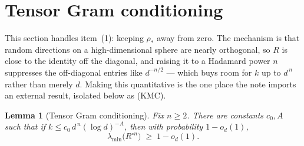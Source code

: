 \documentclass[11pt]{article}
\newtheorem{lemma}{Lemma}
\theoremstyle{remark}
\newcommand{\lmin}{\lambda_{\min}}
\begin{document}
\section{Tensor Gram conditioning}\label{sec:tensor}

This section handles item~(1): keeping $\rho_*$ away from zero. The mechanism is that random directions on a high-dimensional sphere are nearly orthogonal, so $R$ is close to the identity off the diagonal, and raising it to a Hadamard power $n$ suppresses the off-diagonal entries like $d^{-n/2}$ --- which buys room for $k$ up to $d^{\,n}$ rather than merely $d$. Making this quantitative is the one place the note imports an external result, isolated below as (KMC).

\begin{lemma}[Tensor Gram conditioning]\label{lem:tensor}
Fix $n \ge 2$. There are constants $c_0, A$ such that if $k \le c_0\, d^{\,n}(\log d)^{-A}$, then with probability $1 - o_d(1)$,
\[
\lmin\!\big(R^{\circ n}\big) \;\ge\; 1 - o_d(1) .
\]
\end{lemma}
\end{document}

